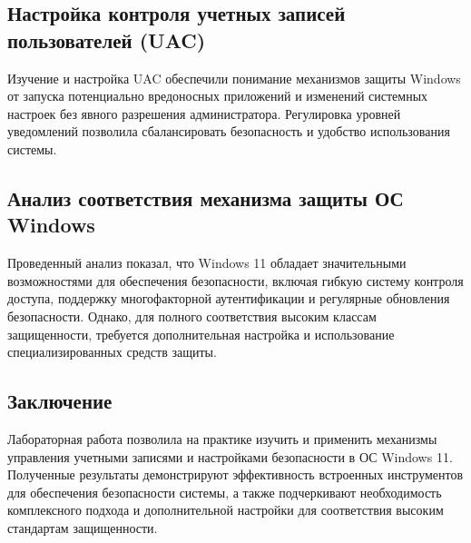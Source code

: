 \documentclass[a4paper, 14pt]{report}
\begin{document}
\subsection{Настройка контроля учетных записей пользователей (UAC)}
Изучение и настройка UAC обеспечили понимание механизмов защиты Windows от запуска потенциально вредоносных приложений и изменений системных настроек без явного разрешения администратора. Регулировка уровней уведомлений позволила сбалансировать безопасность и удобство использования системы.

\subsection{Анализ соответствия механизма защиты ОС Windows}
Проведенный анализ показал, что Windows 11 обладает значительными возможностями для обеспечения безопасности, включая гибкую систему контроля доступа, поддержку многофакторной аутентификации и регулярные обновления безопасности. Однако, для полного соответствия высоким классам защищенности, требуется дополнительная настройка и использование специализированных средств защиты.

\subsection{Заключение}
Лабораторная работа позволила на практике изучить и применить механизмы управления учетными записями и настройками безопасности в ОС Windows 11.
Полученные результаты демонстрируют эффективность встроенных инструментов для обеспечения безопасности системы, а также подчеркивают необходимость комплексного подхода и дополнительной настройки для соответствия высоким стандартам защищенности.
\end{document}
